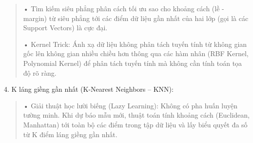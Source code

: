 \begin{quote}
• Tìm kiếm siêu phẳng phân cách tối ưu sao cho khoảng cách (lề - margin)
từ siêu phẳng tới các điểm dữ liệu gần nhất của hai lớp (gọi là các
Support Vectors) là cực đại.

• Kernel Trick: Ánh xạ dữ liệu không phân tách tuyến tính từ không gian
gốc lên không gian nhiều chiều hơn thông qua các hàm nhân (RBF Kernel,
Polynomial Kernel) để phân tách tuyến tính mà không cần tính toán tọa độ
rõ ràng.
\end{quote}

4. K láng giềng gần nhất (K-Nearest Neighbors -- KNN):

\begin{quote}
• Giải thuật học lười biếng (Lazy Learning): Không có pha huấn luyện
tường minh. Khi dự báo mẫu mới, thuật toán tính khoảng cách (Euclidean,
Manhattan) tới toàn bộ các điểm trong tập dữ liệu và lấy biểu quyết đa
số từ K điểm láng giềng gần nhất.
\end{quote}

\label{tab:legacy-2.1}

